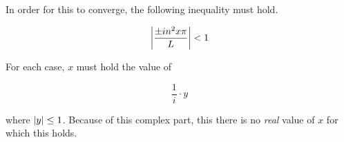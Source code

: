 \documentclass[10pt]{article}
\begin{document}
\begin{easylist}[enumerate]
    In order for this to converge, the following inequality must hold.

    \[
        \left\lvert \frac{\pm in^2x\pi}{L} \right\rvert < 1
    \]

    For each case, $x$ must hold the value of

    \[
        \frac{1}{i} \cdot y
    \]

    where $\left\lvert y \right\rvert \le 1$. Because of this complex part, this there is no \textit{real} value of $x$ for which this
    holds.

\end{easylist}
\end{document}
